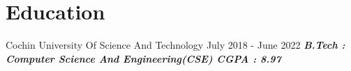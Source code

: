 \section{\textbf{Education}}
{Cochin University Of Science And Technology \hspace{80mm} July 2018 - June 2022}
    \hspace{0.05cm} \textbf{ \textit{B.Tech : Computer Science And Engineering\textbf{(CSE) \hspace{95mm} \textbf{CGPA : 8.97}}}}